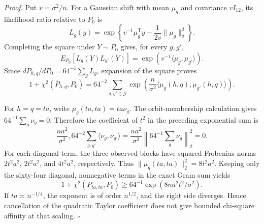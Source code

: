 \textit{Proof.}
Put \(v=\sigma^2/n\).  For a Gaussian shift with mean \(\mu_g\) and covariance
\(vI_{12}\), its likelihood ratio relative to \(P_0\) is
\[
L_g(y)=\exp\!\left\{v^{-1}\mu_g^{\mathsf T}y
-\frac{1}{2v}\lVert\mu_g\rVert_2^2\right\}.
\]
Completing the square under \(Y\sim P_0\) gives, for every \(g,g'\),
\[
E_{P_0}[L_g(Y)L_{g'}(Y)]
=\exp\!\left(v^{-1}\langle\mu_g,\mu_{g'}\rangle\right).
\]
Since \(d\overline P_{h,q}/dP_0=64^{-1}\sum_gL_g\), expansion of the square
proves
\[
1+\chi^2(\overline P_{h,q},P_0)
=64^{-2}\sum_{g,g'\in\mathcal G}
\exp\!\left(\frac n{\sigma^2}
\langle\mu_g(h,q),\mu_{g'}(h,q)\rangle\right).
\]

For \(h=q=ta\), write \(\mu_g(ta,ta)=ta\nu_g\).  The orbit-membership
calculation gives \(64^{-1}\sum_g\nu_g=0\).  Therefore the coefficient of
\(t^2\) in the preceding exponential sum is
\[
\frac{na^2}{\sigma^2},64^{-2}
\sum_{g,g'}\langle\nu_g,\nu_{g'}\rangle
=\frac{na^2}{\sigma^2}
\left\lVert64^{-1}\sum_g\nu_g\right\rVert_2^2=0.
\]
For each diagonal term, the three observed blocks have squared Frobenius norms
\(2t^2a^2\), \(2t^2a^2\), and \(4t^2a^2\), respectively.  Thus
\(\lVert\mu_g(ta,ta)\rVert_2^2=8t^2a^2\).  Keeping only the sixty-four
diagonal, nonnegative terms in the exact Gram sum yields
\[
1+\chi^2(\overline P_{ta,ta},P_0)
\geq64^{-1}\exp(8na^2t^2/\sigma^2).
\]
If \(ta\asymp n^{-1/4}\), the exponent is of order \(n^{1/2}\), and the
right side diverges.  Hence cancellation of the quadratic Taylor coefficient
does not give bounded chi-square affinity at that scaling. \(\square\)
